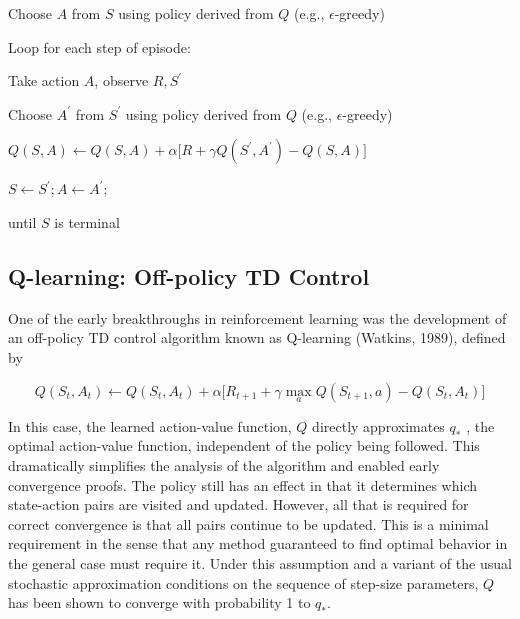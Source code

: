 \documentclass{article}
\begin{document}
\hspace{.5cm} Choose $A$ from $S$ using policy derived from $Q$ (e.g., $\epsilon$-greedy)

\hspace{.5cm} Loop for each step of episode:

\hspace{1cm} Take action $A$, observe $R ,   S ^ { \prime }$

\hspace{1cm} Choose $A ^ { \prime }$ from $S ^ { \prime }$ using policy derived from $Q$ (e.g., $\epsilon$-greedy)

\hspace{1cm} $Q ( S , A ) \leftarrow Q ( S , A ) + \alpha \big [ R + \gamma Q ( S ^ { \prime } , A ^ { \prime } ) - Q ( S , A ) \big ]$

\hspace{1cm} $S \leftarrow S ^ { \prime } ;   A \leftarrow A ^ { \prime } ;$

\hspace{.5cm} until $S$ is terminal

\subsection{Q-learning: Off-policy TD Control}

One of the early breakthroughs in reinforcement learning was the development of an off-policy TD control algorithm known as Q-learning (Watkins, 1989), defined by

$$
Q ( S _ { t } , A _ { t } ) \leftarrow Q ( S _ { t } , A _ { t } ) + \alpha \Big [ R _ { t + 1 } + \gamma \operatorname* { m a x } _ { a } Q ( S _ { t + 1 } , a ) - Q ( S _ { t } , A _ { t } ) \Big ]
$$

In this case, the learned action-value function, $Q$ directly approximates $q _ { * }$ , the optimal action-value function, independent of the policy being followed. 
This dramatically simplifies the analysis of the algorithm and enabled early convergence proofs. The policy still has an effect in that it determines which state-action pairs are visited and updated. 
However, all that is required for correct convergence is that all pairs continue to be updated. This is a minimal requirement in the sense that 
any method guaranteed to find optimal behavior in the general case must require it. Under this assumption and a variant of the usual stochastic approximation conditions on the sequence of step-size parameters, 
$Q$ has been shown to converge with probability 1 to $q _ { * }$.
\end{document}
